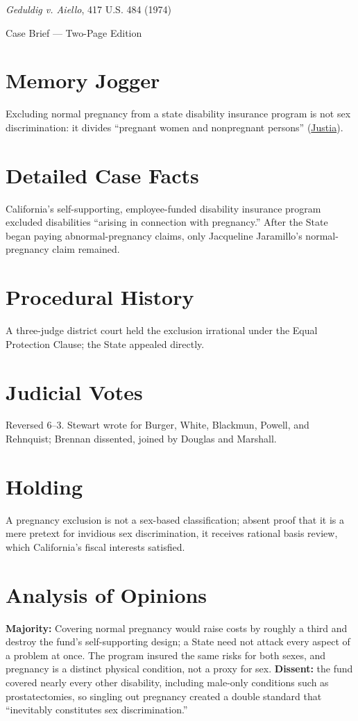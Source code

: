 \documentclass[12pt]{article}
\begin{document}
\begin{center}
{\LARGE \textit{Geduldig v. Aiello}, 417 U.S. 484 (1974)\par}
\vspace{0.5em}
{\large Case Brief --- Two-Page Edition\par}
\end{center}

\section{Memory Jogger}
Excluding normal pregnancy from a state disability insurance program is not sex discrimination: it divides ``pregnant women and nonpregnant persons'' (\href{https://supreme.justia.com/cases/federal/us/417/484/}{Justia}).

\section{Detailed Case Facts}
California's self-supporting, employee-funded disability insurance program excluded disabilities ``arising in connection with pregnancy.'' After the State began paying abnormal-pregnancy claims, only Jacqueline Jaramillo's normal-pregnancy claim remained.

\section{Procedural History}
A three-judge district court held the exclusion irrational under the Equal Protection Clause; the State appealed directly.

\section{Judicial Votes}
Reversed 6--3. Stewart wrote for Burger, White, Blackmun, Powell, and Rehnquist; Brennan dissented, joined by Douglas and Marshall.

\section{Holding}
A pregnancy exclusion is not a sex-based classification; absent proof that it is a mere pretext for invidious sex discrimination, it receives rational basis review, which California's fiscal interests satisfied.

\section{Analysis of Opinions}
\textbf{Majority:} Covering normal pregnancy would raise costs by roughly a third and destroy the fund's self-supporting design; a State need not attack every aspect of a problem at once. The program insured the same risks for both sexes, and pregnancy is a distinct physical condition, not a proxy for sex. \textbf{Dissent:} the fund covered nearly every other disability, including male-only conditions such as prostatectomies, so singling out pregnancy created a double standard that ``inevitably constitutes sex discrimination.''
\end{document}
